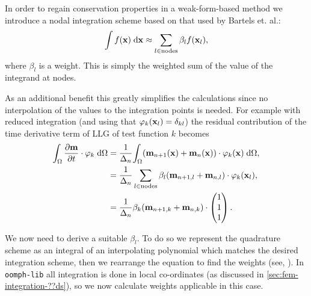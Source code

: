 In order to regain conservation properties in a weak-form-based method we introduce a nodal integration scheme based on that used by Bartels et. al.\cite{Bartels2006}:
\begin{equation}
  \label{eq:nodal-integration}
  \int f(\mathbf{x}) {\; \text{d}} \mathbf{x} \approx \sum_{l\in \text{nodes}} \beta_l f(\mathbf{x}_l),
\end{equation}
where $\beta_l$ is a weight.
This is simply the weighted sum of the value of the integrand at nodes.

As an additional benefit this greatly simplifies the calculations since no interpolation of the values to the integration points is needed.
For example with reduced integration (and using that $\varphi_k(\mathbf{x}_l) = \delta_{kl}$) the residual contribution of the time derivative term of LLG of test function $k$ becomes
\begin{equation}
  \begin{aligned}
    {\int_{\Omega} \frac{\partial \mathbf{m}}{\partial t}\cdot \mathbf{\varphi}_k {\; \text{d}}{\Omega}} &= \frac{1}{\Delta_{n}} {\int_{\Omega} (\mathbf{m}_{n+1}(\mathbf{x}) + \mathbf{m}_{n}(\mathbf{x})) \cdot \mathbf{\varphi}_k(\mathbf{x}) {\; \text{d}} {\Omega}}, \\
    & = \frac{1}{\Delta_{n}} \sum_{l\in \text{nodes}} \beta_l (\mathbf{m}_{n+1, l} + \mathbf{m}_{n, l}) \cdot \mathbf{\varphi}_k(\mathbf{x}_l), \\
    & = \frac{1}{\Delta_{n}} \beta_k (\mathbf{m}_{n+1, k} + \mathbf{m}_{n, k}) \cdot \begin{pmatrix} 1 \\ 1 \\ 1 \end{pmatrix}.
  \end{aligned}
\end{equation}


We now need to derive a suitable $\beta_l$.
To do so we represent the quadrature scheme as an integral of an interpolating polynomial which matches the desired integration scheme, then we rearrange the equation to find the weights (see, \eg \cite[480]{Kincaid2002}).
In \texttt{oomph-lib} all integration is done in local co-ordinates (as discussed in \autoref{sec:fem-integration-??ds}), so we now calculate weights applicable in this case.

